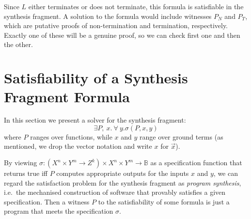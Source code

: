 \documentclass[preprint]{sigplanconf}
\theoremstyle{definition}
\begin{document}
Since $L$ either terminates or does not terminate, this formula is
satisfiable in the synthesis fragment.  A solution to the formula would
include witnesses $P_N$ and $P_T$, which are putative proofs of
non-termination and termination, respectively.  Exactly one of these will be
a genuine proof, so we can check first one and then the other.


% 
% 



\section{Satisfiability of a Synthesis Fragment Formula} \label{sec:synthesis}

In this section we present a solver for the synthesis fragment:
%
\[
  \exists P,~ x . ~\forall~ y . \sigma(P, x, y)
\]
%
where $P$ ranges over functions, while $x$ and $y$ range over ground terms
(as mentioned, we drop the vector notation and write $x$ for $\vec{x}$).

By viewing $\sigma: (X^n \times Y^m \to Z^k) \times X^n \times Y^m  \to
\mathbb{B}$ as a specification function that returns true iff $P$ computes
appropriate outputs for the inputs $x$ and $y$, we can regard the
satisfaction problem for the synthesis fragment as \emph{program synthesis},
i.e.~the mechanised construction of software that provably satisfies a
given specification.  Then a witness $P$ to the satisfiability of some
formula is just a program that meets the specification $\sigma$.
\end{document}
